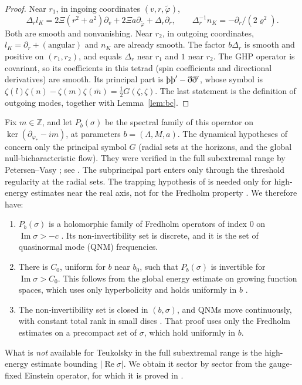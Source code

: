 \documentclass[11pt]{amsart}
\theoremstyle{definition}
\theoremstyle{remark}
\numberwithin{equation}{section}
\newcommand{\Th}{\text{\th}}
\newcommand{\Z}{\mathbb{Z}}
\renewcommand{\Im}{\operatorname{Im}}
\renewcommand{\Re}{\operatorname{Re}}
\begin{document}
\begin{proof}
Near $r_1$, in ingoing coordinates $(v,r,\tilde\varphi)$,
\[
\Delta_rl_K=2\Xi(r^2+a^2)\partial_v+2\Xi a\partial_{\tilde\varphi}+\Delta_r\partial_r,\qquad \Delta_r^{-1}n_K=-\partial_r/(2\varrho^2).
\]
Both are smooth and nonvanishing. Near $r_2$, in outgoing coordinates, $l_K=\partial_r+(\text{angular})$ and $n_K$ are
already smooth. The factor $b\Delta_r$ is smooth and positive on $(r_1,r_2)$, and equals $\Delta_r$ near $r_1$ and $1$
near $r_2$. The GHP operator is covariant, so its coefficients in this tetrad (spin coefficients and directional
derivatives) are smooth. Its principal part is $\Th\Th'-\eth\eth'$, whose symbol is
$\zeta(l)\zeta(n)-\zeta(m)\zeta(\bar m)=\frac12G(\zeta,\zeta)$. The last statement is the definition of outgoing
modes, together with Lemma~\ref{lem:bc}.
\end{proof}

Fix $m\in\Z$, and let $P_b(\sigma)$ be the spectral family of this operator on $\ker(\partial_{\varphi_*}-im)$, at
parameters $b=(\Lambda,M,a)$. The dynamical hypotheses of \cite[\S5.1]{HV18} concern only the principal symbol $G$
(radial sets at the horizons, and the global null-bicharacteristic flow). They were verified in the full
subextremal range by Petersen--Vasy \cite{PV25,PV24}; see \cite[Remark~2.12]{HPV25}. The subprincipal part enters
only through the threshold regularity at the radial sets. The trapping hypothesis of \cite[\S5.1]{HV18} is needed
only for high-energy estimates near the real axis, not for the Fredholm property \cite[Theorem~5.4 and the remark
in its proof]{HV18}. We therefore have:
\begin{enumerate}[label=(F\arabic*)]
\item $P_b(\sigma)$ is a holomorphic family of Fredholm operators of index $0$ on $\Im\sigma>-c$
\cite[Theorem~5.4]{HV18}. Its non-invertibility set is discrete, and it is the set of quasinormal mode (QNM)
frequencies.
\item There is $C_0$, uniform for $b$ near $b_0$, such that $P_b(\sigma)$ is invertible for $\Im\sigma>C_0$. This
follows from the global energy estimate on growing function spaces, which uses only hyperbolicity and holds
uniformly in $b$ \cite[\S5.1.2]{HV18}.
\item The non-invertibility set is closed in $(b,\sigma)$, and QNMs move continuously, with constant total rank in
small discs \cite[Proposition~5.11]{HV18}. That proof uses only the Fredholm estimates \cite[(5.26)]{HV18} on a
precompact set of $\sigma$, which hold uniformly in $b$.
\end{enumerate}
What is \emph{not} available for Teukolsky in the full subextremal range is the high-energy estimate bounding
$|\Re\sigma|$. We obtain it sector by sector from the gauge-fixed Einstein operator, for which it is proved in
\cite{HPV25}.
\end{document}
